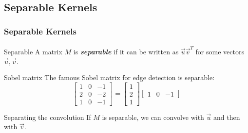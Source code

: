 \documentclass{beamer}                             %
\newcommand{\emphasis}[1]{\textbf{\textit{#1}}}
\begin{document}
\subsection{Separable Kernels}
\begin{frame}
\frametitle{Separable Kernels}
\framesubtitle{}
\begin{alertblock}{Separable}
  A matrix \( M \) is \emphasis{separable} if it can be written as
  \( \vec{u} \vec{v}^T \) for some vectors \( \vec{u}, \vec{v} \).
\end{alertblock}
\pause
\begin{exampleblock}{Sobel matrix}
  The famous Sobel matrix for edge detection is separable:
  \[
    \begin{bmatrix}
      1 & 0 & -1 \\
      2 & 0 & -2 \\
      1 & 0 & -1
    \end{bmatrix}
    =
    \begin{bmatrix}
      1 \\
      2 \\ 
      1
    \end{bmatrix}
    \begin{bmatrix}
      1 & 0 & -1
    \end{bmatrix}
  \]
\end{exampleblock}
\pause
\begin{block}{Separating the convolution}
  If \( M \) is separable, we can convolve with
  \( \vec{u} \) and then with \( \vec{v} \).
\end{block}
\end{frame}
\end{document}
